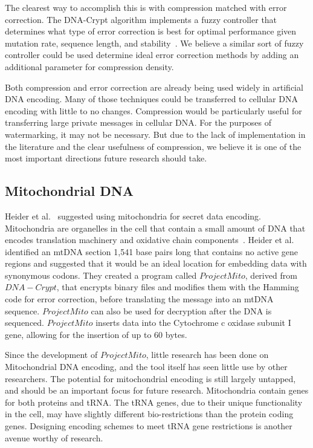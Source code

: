 \documentclass{bioinfo}
\begin{document}
The clearest way to accomplish this is with compression matched with error correction. The DNA-Crypt algorithm implements a fuzzy controller that determines what type of error correction is best for optimal performance given mutation rate, sequence length, and stability~\cite{HBBMC2007}. We believe a similar sort of fuzzy controller could be used determine ideal error correction methods by adding an additional parameter for compression density.

Both compression and error correction are already being used widely in artificial DNA encoding. Many of those techniques could be transferred to cellular DNA encoding with little to no changes. Compression would be particularly useful for transferring large private messages in cellular DNA. For the purposes of watermarking, it may not be necessary. But due to the lack of implementation in the literature and the clear usefulness of compression, we believe it is one of the most important directions future research should take.

\subsection{Mitochondrial DNA}

Heider et al.~\cite{HKB2008B} suggested using mitochondria for secret data encoding. Mitochondria are organelles in the cell that contain a small amount of DNA that encodes translation machinery and oxidative chain components~\cite{GV2001G}. Heider et al. identified an mtDNA section 1,541 base pairs long that contains no active gene regions and suggested that it would be an ideal location for embedding data with synonymous codons. They created a program called $Project Mito$, derived from $DNA-Crypt$, that encrypts binary files and modifies them with the Hamming code for error correction, before translating the message into an mtDNA sequence. $Project Mito$ can also be used for decryption after the DNA is sequenced. $Project Mito$ inserts data into the Cytochrome c oxidase subunit I gene, allowing for the insertion of up to 60 bytes.

Since the development of $Project Mito$, little research has been done on Mitochondrial DNA encoding, and the tool itself has seen little use by other researchers. The potential for mitochondrial encoding is still largely untapped, and should be an important focus for future research. Mitochondria contain genes for both proteins and tRNA. The tRNA genes, due to their unique functionality in the cell, may have slightly different bio-restrictions than the protein coding genes. Designing encoding schemes to meet tRNA gene restrictions is another avenue worthy of research.
\end{document}

